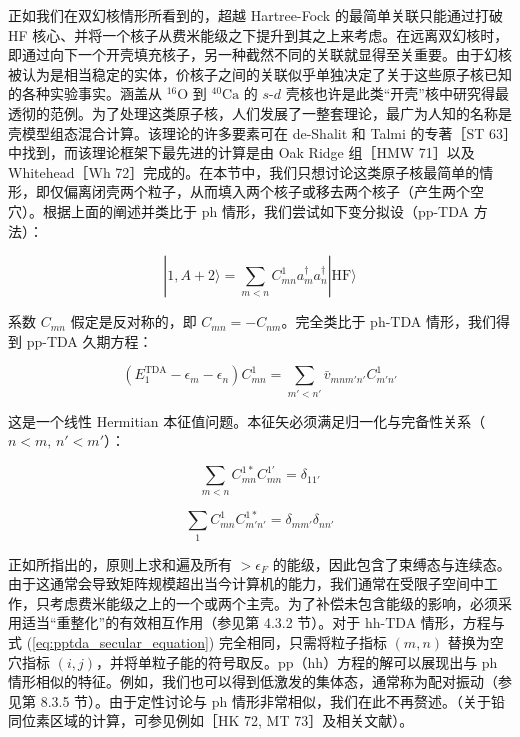 正如我们在双幻核情形所看到的，超越 Hartree-Fock 的最简单关联只能通过打破 HF 核心、并将一个核子从费米能级之下提升到其之上来考虑。在远离双幻核时，即通过向下一个开壳填充核子，另一种截然不同的关联就显得至关重要。由于幻核被认为是相当稳定的实体，价核子之间的关联似乎单独决定了关于这些原子核已知的各种实验事实。涵盖从
$^{16}\mathrm{O}$ 到 $^{40}\mathrm{Ca}$ 的 $s\text{-}d$ 壳核也许是此类“开壳”核中研究得最透彻的范例。为了处理这类原子核，人们发展了一整套理论，最广为人知的名称是壳模型组态混合计算。该理论的许多要素可在
de-Shalit 和 Talmi 的专著［ST 63］中找到，而该理论框架下最先进的计算是由 Oak Ridge 组［HMW 71］以及
Whitehead［Wh 72］完成的。在本节中，我们只想讨论这类原子核最简单的情形，即仅偏离闭壳两个粒子，从而填入两个核子或移去两个核子（产生两个空穴）。根据上面的阐述并类比于
ph 情形，我们尝试如下变分拟设（pp-TDA 方法）：

\begin{equation}
|1,A+2\rangle=\sum_{m<n}C^{1}_{mn}a^{\dagger}_{m}a^{\dagger}_{n}|\text{HF}\rangle\label{eq:pptda_ansatz}
\end{equation}

系数 $C_{mn}$ 假定是反对称的，即 $C_{mn}=-C_{nm}$。完全类比于 ph-TDA 情形，我们得到 pp-TDA
久期方程：

\begin{equation}
(E^{\text{TDA}}_{1}-\epsilon_{m}-\epsilon_{n})C^{1}_{mn}=\sum_{m'<n'}\bar{v}_{mnm'n'}C^{1}_{m'n'}\label{eq:pptda_secular_equation}
\end{equation}

这是一个线性 Hermitian 本征值问题。本征矢必须满足归一化与完备性关系（$n<m,\,n'<m'$）：

\begin{equation}
\sum_{m<n}C^{1*}_{mn}C^{1'}_{mn}=\delta_{11'}\label{eq:pptda_orthonormality}
\end{equation}

\begin{equation}
\sum_{1}C^{1}_{mn}C^{1*}_{m'n'}=\delta_{mm'}\delta_{nn'}\label{eq:pptda_closure}
\end{equation}

正如所指出的，原则上求和遍及所有 $>\epsilon_{F}$ 的能级，因此包含了束缚态与连续态。由于这通常会导致矩阵规模超出当今计算机的能力，我们通常在受限子空间中工作，只考虑费米能级之上的一个或两个主壳。为了补偿未包含能级的影响，必须采用适当“重整化”的有效相互作用（参见第
4.3.2 节）。对于 hh-TDA 情形，方程与式 (\ref{eq:pptda_secular_equation}) 完全相同，只需将粒子指标
$(m,n)$ 替换为空穴指标 $(i,j)$，并将单粒子能的符号取反。pp（hh）方程的解可以展现出与 ph 情形相似的特征。例如，我们也可以得到低激发的集体态，通常称为配对振动（参见第
8.3.5 节）。由于定性讨论与 ph 情形非常相似，我们在此不再赘述。（关于铅同位素区域的计算，可参见例如［HK 72, MT 73］及相关文献）。

